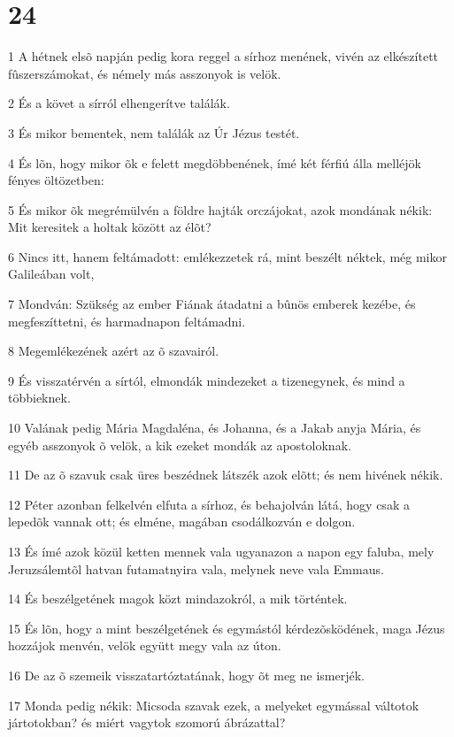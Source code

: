 \chapter{24}

\par 1 A hétnek elsõ napján pedig kora reggel a sírhoz menének, vivén az elkészített fûszerszámokat, és némely más asszonyok is velök.
\par 2 És a követ a sírról elhengerítve találák.
\par 3 És mikor bementek, nem találák az Úr Jézus testét.
\par 4 És lõn, hogy mikor õk e felett megdöbbenének, ímé két férfiú álla melléjök fényes öltözetben:
\par 5 És mikor õk megrémülvén a földre hajták orczájokat, azok mondának nékik: Mit keresitek a holtak között az élõt?
\par 6 Nincs itt, hanem feltámadott: emlékezzetek rá, mint beszélt néktek, még mikor Galileában volt,
\par 7 Mondván: Szükség az ember Fiának átadatni a bûnös emberek kezébe, és megfeszíttetni, és harmadnapon feltámadni.
\par 8 Megemlékezének azért az õ szavairól.
\par 9 És visszatérvén a sírtól, elmondák mindezeket a tizenegynek, és mind a többieknek.
\par 10 Valának pedig Mária Magdaléna, és Johanna, és a Jakab anyja Mária, és egyéb asszonyok õ velök, a kik ezeket mondák az apostoloknak.
\par 11 De az õ szavuk csak üres beszédnek látszék azok elõtt; és nem hivének nékik.
\par 12 Péter azonban felkelvén elfuta a sírhoz, és behajolván látá, hogy csak a lepedõk vannak ott; és elméne, magában csodálkozván e dolgon.
\par 13 És ímé azok közül ketten mennek vala ugyanazon a napon egy faluba, mely Jeruzsálemtõl hatvan futamatnyira vala, melynek neve vala Emmaus.
\par 14 És beszélgetének magok közt mindazokról, a mik történtek.
\par 15 És lõn, hogy a mint beszélgetének és egymástól kérdezõsködének, maga Jézus hozzájok menvén, velök együtt megy vala az úton.
\par 16 De az õ szemeik visszatartóztatának, hogy õt meg ne ismerjék.
\par 17 Monda pedig nékik: Micsoda szavak ezek, a melyeket egymással váltotok jártotokban? és miért vagytok szomorú ábrázattal?
